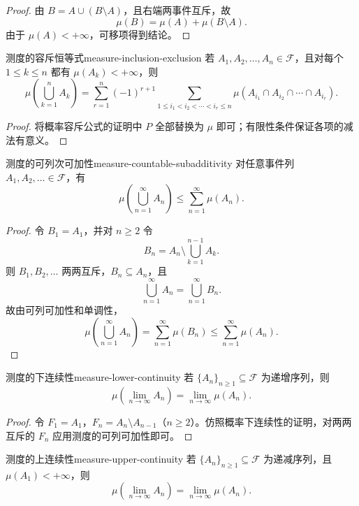 \begin{proof}
由 $B=A\cup(B\setminus A)$，且右端两事件互斥，故
\[
\mu(B)=\mu(A)+\mu(B\setminus A).
\]
由于 $\mu(A)<+\infty$，可移项得到结论。
\end{proof}

\begin{proposition}{测度的容斥恒等式}{measure-inclusion-exclusion}
若 $A_1,A_2,\ldots,A_n\in\mathscr{F}$，且对每个 $1\leq k\leq n$ 都有 $\mu(A_k)<+\infty$，则
\[
\mu\left(\bigcup_{k=1}^{n}A_k\right)
=\sum_{r=1}^{n}(-1)^{r+1}
\sum_{1\leq i_1<i_2<\cdots<i_r\leq n}
\mu(A_{i_1}\cap A_{i_2}\cap\cdots\cap A_{i_r}).
\]
\end{proposition}

\begin{proof}
将概率容斥公式的证明中 $P$ 全部替换为 $\mu$ 即可；有限性条件保证各项的减法有意义。
\end{proof}

\begin{mytheorem}{测度的可列次可加性}{measure-countable-subadditivity}
对任意事件列 $A_1,A_2,\ldots\in\mathscr{F}$，有
\[
\mu\left(\bigcup_{n=1}^{\infty}A_n\right)
\leq\sum_{n=1}^{\infty}\mu(A_n).
\]
\end{mytheorem}

\begin{proof}
令 $B_1=A_1$，并对 $n\geq2$ 令
\[
B_n=A_n\setminus\bigcup_{k=1}^{n-1}A_k.
\]
则 $B_1,B_2,\ldots$ 两两互斥，$B_n\subseteq A_n$，且
\[
\bigcup_{n=1}^{\infty}A_n=\bigcup_{n=1}^{\infty}B_n.
\]
故由可列可加性和单调性，
\[
\mu\left(\bigcup_{n=1}^{\infty}A_n\right)
=\sum_{n=1}^{\infty}\mu(B_n)
\leq\sum_{n=1}^{\infty}\mu(A_n).
\]
\end{proof}

\begin{proposition}{测度的下连续性}{measure-lower-continuity}
若 $\{A_n\}_{n\geq1}\subseteq\mathscr{F}$ 为递增序列，则
\[
\mu\left(\lim_{n\to\infty}A_n\right)
=\lim_{n\to\infty}\mu(A_n).
\]
\end{proposition}

\begin{proof}
令 $F_1=A_1$，$F_n=A_n\setminus A_{n-1}$（$n\geq2$）。仿照概率下连续性的证明，对两两互斥的 $F_n$ 应用测度的可列可加性即可。
\end{proof}

\begin{proposition}{测度的上连续性}{measure-upper-continuity}
若 $\{A_n\}_{n\geq1}\subseteq\mathscr{F}$ 为递减序列，且 $\mu(A_1)<+\infty$，则
\[
\mu\left(\lim_{n\to\infty}A_n\right)
=\lim_{n\to\infty}\mu(A_n).
\]
\end{proposition}

